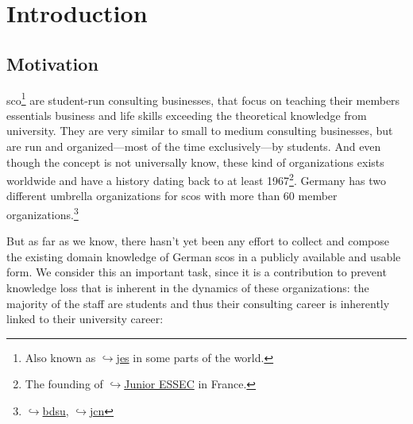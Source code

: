 \documentclass[a4paper, DIV=13, BCOR=0cm]{scrbook}
\newcommand{\link}[2]{\href{#1}{$\hookrightarrow$#2}}
\begin{document}

\newpage

\tableofcontents
\newpage

\mainmatter
\chapter{Introduction }
\section{Motivation }
\gls{sco}\footnote{Also known as \link{https://en.wikipedia.org/wiki/Junior_enterprise}{\glspl{je}} in some parts of the world.} are student-run consulting businesses, that focus on teaching their members essentials business and life skills exceeding the theoretical knowledge from university. They are very similar to small to medium consulting businesses, but are run and organized---most of the time exclusively---by students. And even though the concept is not universally know, these kind of organizations exists worldwide and have a history dating back to at least 1967\footnote{The founding of \link{https://www.en.junioressec.com/}{Junior ESSEC} in France.}. Germany has two different umbrella organizations for \glspl{sco} with more than 60 member organizations.\footnote{\link{https://bdsu.de}{\gls{bdsu}}, \link{https://jcnetwork.de}{\gls{jcn}}}

But as far as we know, there hasn't yet been any effort to collect and compose the existing domain knowledge of German \glspl{sco} in a publicly available and usable form. We consider this an important task, since it is a contribution to prevent knowledge loss that is inherent in the dynamics of these organizations: the majority of the staff are students and thus their consulting career is inherently linked to their university career:
\end{document}

